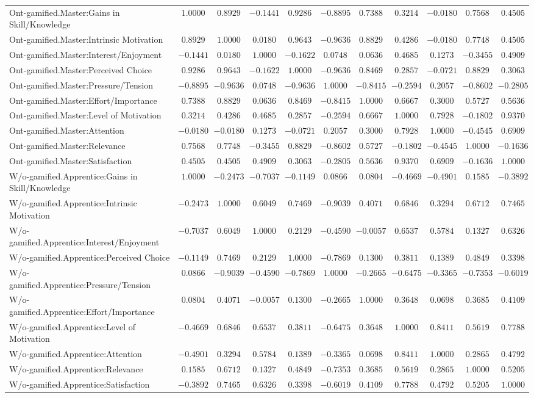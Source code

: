 \begin{landscape}
{\begin{longtable}{lrrrrrrrrrr}
Ont-gamified.Master:Gains in Skill/Knowledge&$ 1.0000$&$ 0.8929$&$-0.1441$&$ 0.9286$&$-0.8895$&$ 0.7388$&$ 0.3214$&$-0.0180$&$ 0.7568$&$ 0.4505$\tabularnewline
Ont-gamified.Master:Intrinsic Motivation&$ 0.8929$&$ 1.0000$&$ 0.0180$&$ 0.9643$&$-0.9636$&$ 0.8829$&$ 0.4286$&$-0.0180$&$ 0.7748$&$ 0.4505$\tabularnewline
Ont-gamified.Master:Interest/Enjoyment&$-0.1441$&$ 0.0180$&$ 1.0000$&$-0.1622$&$ 0.0748$&$ 0.0636$&$ 0.4685$&$ 0.1273$&$-0.3455$&$ 0.4909$\tabularnewline
Ont-gamified.Master:Perceived Choice&$ 0.9286$&$ 0.9643$&$-0.1622$&$ 1.0000$&$-0.9636$&$ 0.8469$&$ 0.2857$&$-0.0721$&$ 0.8829$&$ 0.3063$\tabularnewline
Ont-gamified.Master:Pressure/Tension&$-0.8895$&$-0.9636$&$ 0.0748$&$-0.9636$&$ 1.0000$&$-0.8415$&$-0.2594$&$ 0.2057$&$-0.8602$&$-0.2805$\tabularnewline
Ont-gamified.Master:Effort/Importance&$ 0.7388$&$ 0.8829$&$ 0.0636$&$ 0.8469$&$-0.8415$&$ 1.0000$&$ 0.6667$&$ 0.3000$&$ 0.5727$&$ 0.5636$\tabularnewline
Ont-gamified.Master:Level of Motivation&$ 0.3214$&$ 0.4286$&$ 0.4685$&$ 0.2857$&$-0.2594$&$ 0.6667$&$ 1.0000$&$ 0.7928$&$-0.1802$&$ 0.9370$\tabularnewline
Ont-gamified.Master:Attention&$-0.0180$&$-0.0180$&$ 0.1273$&$-0.0721$&$ 0.2057$&$ 0.3000$&$ 0.7928$&$ 1.0000$&$-0.4545$&$ 0.6909$\tabularnewline
Ont-gamified.Master:Relevance&$ 0.7568$&$ 0.7748$&$-0.3455$&$ 0.8829$&$-0.8602$&$ 0.5727$&$-0.1802$&$-0.4545$&$ 1.0000$&$-0.1636$\tabularnewline
Ont-gamified.Master:Satisfaction&$ 0.4505$&$ 0.4505$&$ 0.4909$&$ 0.3063$&$-0.2805$&$ 0.5636$&$ 0.9370$&$ 0.6909$&$-0.1636$&$ 1.0000$\tabularnewline
\hline


W/o-gamified.Apprentice:Gains in Skill/Knowledge&$ 1.0000$&$-0.2473$&$-0.7037$&$-0.1149$&$ 0.0866$&$ 0.0804$&$-0.4669$&$-0.4901$&$ 0.1585$&$-0.3892$\tabularnewline
W/o-gamified.Apprentice:Intrinsic Motivation&$-0.2473$&$ 1.0000$&$ 0.6049$&$ 0.7469$&$-0.9039$&$ 0.4071$&$ 0.6846$&$ 0.3294$&$ 0.6712$&$ 0.7465$\tabularnewline
W/o-gamified.Apprentice:Interest/Enjoyment&$-0.7037$&$ 0.6049$&$ 1.0000$&$ 0.2129$&$-0.4590$&$-0.0057$&$ 0.6537$&$ 0.5784$&$ 0.1327$&$ 0.6326$\tabularnewline
W/o-gamified.Apprentice:Perceived Choice&$-0.1149$&$ 0.7469$&$ 0.2129$&$ 1.0000$&$-0.7869$&$ 0.1300$&$ 0.3811$&$ 0.1389$&$ 0.4849$&$ 0.3398$\tabularnewline
W/o-gamified.Apprentice:Pressure/Tension&$ 0.0866$&$-0.9039$&$-0.4590$&$-0.7869$&$ 1.0000$&$-0.2665$&$-0.6475$&$-0.3365$&$-0.7353$&$-0.6019$\tabularnewline
W/o-gamified.Apprentice:Effort/Importance&$ 0.0804$&$ 0.4071$&$-0.0057$&$ 0.1300$&$-0.2665$&$ 1.0000$&$ 0.3648$&$ 0.0698$&$ 0.3685$&$ 0.4109$\tabularnewline
W/o-gamified.Apprentice:Level of Motivation&$-0.4669$&$ 0.6846$&$ 0.6537$&$ 0.3811$&$-0.6475$&$ 0.3648$&$ 1.0000$&$ 0.8411$&$ 0.5619$&$ 0.7788$\tabularnewline
W/o-gamified.Apprentice:Attention&$-0.4901$&$ 0.3294$&$ 0.5784$&$ 0.1389$&$-0.3365$&$ 0.0698$&$ 0.8411$&$ 1.0000$&$ 0.2865$&$ 0.4792$\tabularnewline
W/o-gamified.Apprentice:Relevance&$ 0.1585$&$ 0.6712$&$ 0.1327$&$ 0.4849$&$-0.7353$&$ 0.3685$&$ 0.5619$&$ 0.2865$&$ 1.0000$&$ 0.5205$\tabularnewline
W/o-gamified.Apprentice:Satisfaction&$-0.3892$&$ 0.7465$&$ 0.6326$&$ 0.3398$&$-0.6019$&$ 0.4109$&$ 0.7788$&$ 0.4792$&$ 0.5205$&$ 1.0000$\tabularnewline
\hline


\end{longtable}}
\end{landscape}
